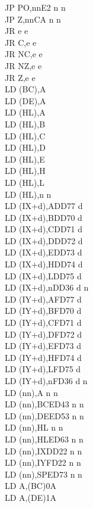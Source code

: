 \documentclass[twoside,openright,a4paper]{book}
\begin{document}
\begin{multicols}{3}
{\begin{tabbing}
	JP PO,nn\>E2 n n\\
	JP Z,nn\>CA n n\\
	JR e e\\
	JR C,e e\\
	JR NC,e e\\
	JR NZ,e e\\
	JR Z,e e\\
	LD (BC),A\\
	LD (DE),A\\
	LD (HL),A\\
	LD (HL),B\\
	LD (HL),C\\
	LD (HL),D\\
	LD (HL),E\\
	LD (HL),H\\
	LD (HL),L\\
	LD (HL),n n\\
	LD (IX+d),A\>DD77 d\\
	LD (IX+d),B\>DD70 d\\
	LD (IX+d),C\>DD71 d\\
	LD (IX+d),D\>DD72 d\\
	LD (IX+d),E\>DD73 d\\
	LD (IX+d),H\>DD74 d\\
	LD (IX+d),L\>DD75 d\\
	LD (IX+d),n\>DD36 d n\\
	LD (IY+d),A\>FD77 d\\
	LD (IY+d),B\>FD70 d\\
	LD (IY+d),C\>FD71 d\\
	LD (IY+d),D\>FD72 d\\
	LD (IY+d),E\>FD73 d\\
	LD (IY+d),H\>FD74 d\\
	LD (IY+d),L\>FD75 d\\
	LD (IY+d),n\>FD36 d n\\
	LD (nn),A n n\\
	LD (nn),BC\>ED43 n n\\
	LD (nn),DE\>ED53 n n\\
	LD (nn),HL n n\\
	LD (nn),HL\>ED63 n n\\
	LD (nn),IX\>DD22 n n\\
	LD (nn),IY\>FD22 n n\\
	LD (nn),SP\>ED73 n n\\
	LD A,(BC)\>0A\\
	LD A,(DE)\>1A\\

\end{tabbing}}
\end{multicols}
\end{document}
